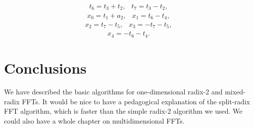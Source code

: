\documentclass[fleqn,12pt]{article}
\begin{document}
\begin{equation}
\begin{array}{ll}
t_6 = t_3 + t_2, & t_7 = t_3 - t_2,
\end{array}
\end{equation}
\begin{equation}
\begin{array}{ll}
x_0 = t_1 + a_2, & x_1 = t_6 - t_4 ,
\end{array}
\end{equation}
\begin{equation}
\begin{array}{ll}
x_2 = t_7 - t_5, & x_3 = - t_7 - t_5,
\end{array}
\end{equation}
\begin{equation}
\begin{array}{ll}
x_4 = -t_6 - t_4.
\end{array}
\end{equation}

\section{Conclusions}
%
We have described the basic algorithms for one-dimensional radix-2 and
mixed-radix FFTs. It would be nice to have a pedagogical explanation
of the split-radix FFT algorithm, which is faster than the simple
radix-2 algorithm we used. We could also have a whole chapter on
multidimensional FFTs.
%

 
 
\end{document}
